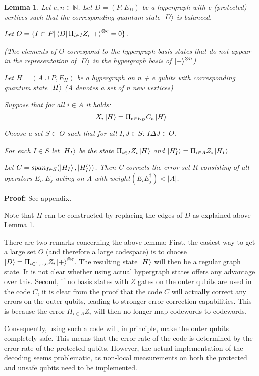 \documentclass[12pt]{iopart}
\newtheorem{lemma}{Lemma}
\begin{document}
\begin{lemma}
\label{lemmaGeneralEAECC}
Let $e,n \in \mathbb{N}$.
Let $D = (P,E_D)$ be a hypergraph with e (protected) vertices such that the corresponding quantum state $\ket{D}$ is balanced.  

Let $O = \{I \subset P | \bra{D}\Pi_{i \in I} Z_i \ket{+}^{\otimes e} = 0 \}$. 

(The elements of $O$ correspond to the hypergraph basis states that do not appear in the representation of $\ket{D}$ in the hypergraph basis of $\ket{+}^{\otimes n}$)

Let $H = (A \cup P,E_H)$ be a hypergraph on n + e qubits with corresponding quantum state $\ket{H}$ (A denotes a set of n new vertices)

Suppose that for all $i \in A$ it holds: 
\begin{equation}
X_i \ket{H} = \Pi_{e \in E_D} C_e \ket{H}
\end{equation} 

Choose a set $S \subset O$ such that for all $I,J \in S$: $I \Delta J \in O$.

For each $I \in S$ let $\ket{H_I}$ be the state $\Pi_{i \in I} Z_i \ket{H}$ and  $\ket{H_I^\prime} = \Pi_{i \in A} Z_i \ket{H_I}$

Let $C = span_{I \in S}(\ket{H_I}, \ket{H_I^\prime})$.
Then C corrects the error set $R$ consisting of all operators $E_i,E_j$ acting on A with $weight(E_iE_j^\dagger) < |A|$.
\end{lemma}

\textbf{Proof:} See appendix.

Note that $H$ can be constructed by replacing the edges of $D$ as explained above Lemma \ref{lemmaGeneralEAECC}.

There are two remarks concerning the above lemma:
First, the easiest way to get a large set $O$ (and therefore a large codespace) is to choose $\ket{D} =  \Pi_{i \in {1,..,e}} Z_i \ket{+}^{\otimes e}$. The resulting state $\ket{H}$ will then be a regular graph state. It is not clear whether using actual hypergraph states offers any advantage over this.
Second, if no basis states with $Z$ gates on the outer qubits are used in the code $C$, it is clear from the proof that the code $C$ will actually correct any errors on the outer qubits, leading to stronger error correction capabilities. This is because the error $\Pi_{i \in A} Z_i$ will then no longer map codewords to codewords.

Consequently, using such a code will, in principle, make the outer qubits completely safe. This means that the error rate of the code is determined by the error rate of the protected qubits. However, the actual implementation of the decoding seems problematic, as non-local measurements on both the protected and unsafe qubits need to be implemented.
\end{document}
